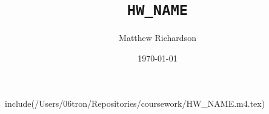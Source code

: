 \documentclass[12pt]{article}
\title{\vspace{-2cm}\texttt{HW_NAME}}
\author{Matthew Richardson}
\date\today
\begin{document}
\maketitle
include(/Users/06tron/Repositories/coursework/HW_NAME.m4.tex)%
\end{document}

